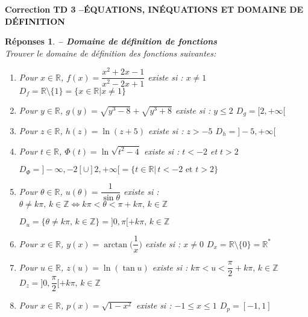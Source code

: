 \documentclass[a4paper,11pt]{article}
\newenvironment{alphate}{\begin{enumerate}[label=\alph*)]}{\end{enumerate}}
\newtheorem{rep}{R\'eponses}
\newenvironment{reponse}{\begin{rep} \em}{\end{rep}}
\begin{document}



\begin{center}
{\bf Correction TD 3 \quad--\quad \'EQUATIONS, IN\'EQUATIONS ET DOMAINE DE 
D\'EFINITION}
\end{center}
\bigskip 

\addtocounter{rep}{14}


\begin{reponse} {\bf -- Domaine de d\'efinition de fonctions}
\label{TD6-domaine}\\ 
Trouver le domaine de d\'efinition des fonctions suivantes:
\begin{alphate}
\item Pour $ x \in \mathbb{R}$, $f(x)=\dfrac{x^2+2x-1}{x^2-2x+1}$ existe si :
    $x \neq 1 $  \hspace{1cm}
    $\boxed{D_f = \mathbb{R}\setminus\{1\} = \{x \in \mathbb{R} | x \neq 1\}}$
\item  Pour $ y \in \mathbb{R}$, $g(y)=\sqrt{y^3-8}+\sqrt{y^3+8}$ existe si :
    $y \leq 2 $  \hspace{1cm}
    $\boxed{D_g = [2, +\infty[}$  
\item Pour $ z \in \mathbb{R}$, $h(z)=\ln(z+5)$ existe si :
    $z > -5 $  \hspace{1cm}
    $\boxed{D_h = ]-5, +\infty[}$
\item Pour $ t \in \mathbb{R}$, $\Phi(t)=\ln\sqrt{t^2-4}$ existe si :
    $t < -2$ et $t >2$ 
    \begin{center}
        $\boxed{D_{\Phi} =]-\infty,-2[\cup]2,+\infty[= \{t \in \mathbb{R} | \, t < -2 \text{ et } t >2 \}}$
    \end{center}
\item Pour $ \theta \in \mathbb{R}$, $u(\theta)=\dfrac{1}{\sin\theta}$ existe si :
    $ \theta \neq k\pi, \, k\in \mathbb{Z} \Leftrightarrow k\pi < \theta < \pi + k\pi, \, k\in \mathbb{Z} $      
    \begin{center}
        $\boxed{D_{u} = \{\theta \neq k\pi, \, k\in \mathbb{Z} \}
        =]0,\pi[ + k \pi, \, k\in \mathbb{Z} }$
    \end{center}
\item Pour $ x \in \mathbb{R}$, $y(x)=\arctan \big(\dfrac{1}{x}\big)$ existe si :
    $x \neq 0 $  \hspace{1cm}
    $\boxed{D_x = \mathbb{R}\setminus\{0\} =  \mathbb{R}^* }$
\item Pour $u \in \mathbb{R}$, $z(u)=\ln(\tan u)$  existe si :
    $ k\pi < u < \dfrac{\pi}{2} + k\pi, \, k\in \mathbb{Z}  $  \hspace{1cm}
    $\boxed{D_z =]0,\dfrac{\pi}{2} [ + k \pi, \, k\in \mathbb{Z}}$
\item Pour $ x \in \mathbb{R}$, $p(x)=\sqrt{1-x^2}$ existe si :
    $ -1 \leq x \leq 1 $  \hspace{1cm}
    $\boxed{D_p = [-1,1]}$
    

\end{alphate}
\end{reponse}
\end{document}
